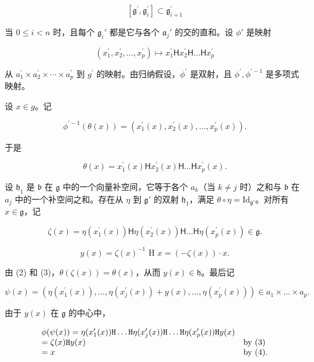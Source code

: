 \[
[ \mathfrak {g} ^ {\prime}, \mathfrak {g} _ {i} ^ {\prime} ] \subset \mathfrak {g} _ {i + 1} ^ {\prime}
\]

当 \(0 \leqslant i < n\) 时，且每个 \(\mathfrak{g}_i'\) 都是它与各个 \(\mathfrak{a}_j'\) 的交的直和。设 \(\phi'\) 是映射

\[
\left(x _ {1} ^ {\prime}, x _ {2} ^ {\prime}, \dots , x _ {p} ^ {\prime}\right) \mapsto x _ {1} ^ {\prime} \mathsf {H} x _ {2} ^ {\prime} \mathsf {H} \dots \mathsf {H} x _ {p} ^ {\prime}
\]

从 \(a_{1}^{\prime} \times a_{2}^{\prime} \times \cdots \times a_{p}^{\prime}\) 到 \(g^{\prime}\) 的映射。由归纳假设，\(\phi^{\prime}\) 是双射，且 \(\phi^{\prime}, \phi^{\prime-1}\) 是多项式映射。

设 \(x \in g\)。记

\[
\phi^ {\prime - 1} (\theta (x)) = \left(x _ {1} ^ {\prime} (x), x _ {2} ^ {\prime} (x), \dots , x _ {p} ^ {\prime} (x)\right).\tag{1}
\]

于是

\[
\theta (x) = x _ {1} ^ {\prime} (x) \mathsf {H} x _ {2} ^ {\prime} (x) \mathsf {H} \dots \mathsf {H} x _ {p} ^ {\prime} (x).\tag{2}
\]

设 \(\mathfrak{h}_1\) 是 \(\mathfrak{b}\) 在 \(\mathfrak{g}\) 中的一个向量补空间，它等于各个 \(a_k\)（当 \(k \neq j\) 时）之和与 \(\mathfrak{b}\) 在 \(a_j\) 中的一个补空间之和。存在从 \(\eta\) 到 \(\mathfrak{g}'\) 的双射 \(\mathfrak{h}_1\)，满足 \(\theta \circ \eta = \mathrm{Id}_{\mathfrak{g}'}\)。对所有 \(x \in \mathfrak{g}\)，记

\[
\zeta (x) = \eta (x _ {1} ^ {\prime} (x)) \mathsf {H} \eta (x _ {2} ^ {\prime} (x)) \mathsf {H} \dots \mathsf {H} \eta (x _ {p} ^ {\prime} (x)) \in \mathfrak {g}.\tag{3}
\]

\[
y (x) = \zeta (x) ^ {- 1} \text { H } x = (- \zeta (x))\cdot x.\tag{4}
\]

由 (2) 和 (3)，\(\theta (\zeta (x)) = \theta (x)\)，从而 \(y(x)\in \mathfrak{h}\)。最后记

\[
\psi (x) = \left(\eta \left(x _ {1} ^ {\prime} (x)\right), \dots , \eta \left(x _ {j} ^ {\prime} (x)\right) + y (x), \dots , \eta \left(x _ {p} ^ {\prime} (x)\right)\right) \in a _ {1} \times \dots \times a _ {p}.\tag{5}
\]

由于 \(y(x)\) 在 \(\mathfrak{g}\) 的中心中，

\[
\begin{array}{l l} \phi (\psi (x)) = \eta (x _ {1} ^ {\prime} (x)) \texttt {H} \dots \texttt {H} \eta (x _ {j} ^ {\prime} (x)) \texttt {H} \dots \texttt {H} \eta (x _ {p} ^ {\prime} (x)) \texttt {H} y (x) \\ = \zeta (x) \texttt {H} y (x) & \text {by (3)} \\ = x & \text {by (4)}. \end{array}
\]

